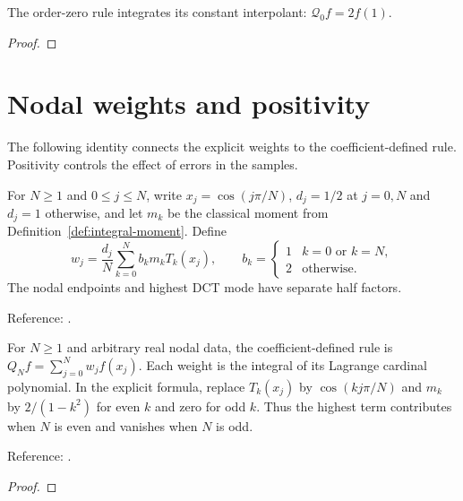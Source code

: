 \begin{supporting}

\begin{theorem}
\label{thm:clenshaw-curtis-zero}
\leanok
The order-zero rule integrates its constant interpolant: $\mathcal Q_0f=2f(1)$.
\end{theorem}
\begin{proof}
\leanok
\end{proof}

\end{supporting}

\section{Nodal weights and positivity}\label{sec:textbook-cc-weights}

The following identity connects the explicit weights to the coefficient-defined rule. Positivity controls the effect of errors in the samples.

\begin{definition}
\label{def:clenshaw-curtis-weights}
\leanok
For $N\ge1$ and $0\le j\le N$, write $x_j=\cos(j\pi/N)$, $d_j=1/2$ at $j=0,N$ and $d_j=1$
otherwise, and let $m_k$ be the classical moment from Definition~\ref{def:integral-moment}. Define
\[
 w_j=\frac{d_j}{N}\sum_{k=0}^N b_k m_k T_k(x_j),\qquad
 b_k=\begin{cases}1&k=0\text{ or }k=N,\\2&\text{otherwise}.\end{cases}
\]
The nodal endpoints and highest DCT mode have separate half factors.

Reference: \cite[Chapters 4 and 19]{atap}.
\end{definition}

\begin{theorem}
\label{thm:clenshaw-curtis-weights}
\leanok
For $N\ge1$ and arbitrary real nodal data, the coefficient-defined rule
is $Q_Nf=\sum_{j=0}^Nw_jf(x_j)$. Each weight is the integral of its Lagrange
cardinal polynomial. In the explicit formula, replace $T_k(x_j)$ by
$\cos(kj\pi/N)$ and $m_k$ by $2/(1-k^2)$ for even $k$ and zero for odd $k$.
Thus the highest term contributes when $N$ is even and vanishes when $N$ is odd.

Reference: \cite[Chapters 4 and 19]{atap}.
\end{theorem}
\begin{proof}
\leanok
\end{proof}

